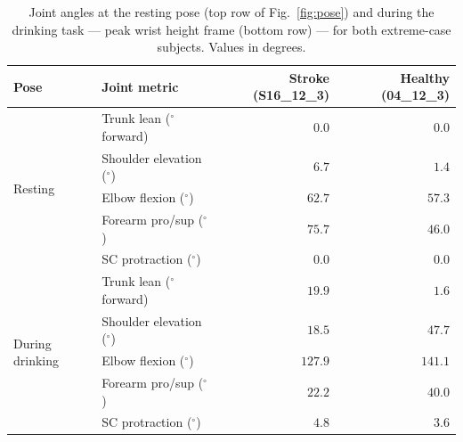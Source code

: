 \documentclass[journal,10pt,twocolumn]{IEEEtran}
\begin{document}
\begin{table}[h]
  \centering
  \caption{Joint angles at the resting pose (top row of Fig.~\ref{fig:pose})
           and during the drinking task --- peak wrist height frame (bottom row)
           --- for both extreme-case subjects. Values in degrees.}
  \label{tab:pose}
  \setlength{\tabcolsep}{6pt}
  \begin{tabular}{llrr}
    \toprule
    \textbf{Pose} & \textbf{Joint metric}
      & \textbf{Stroke (S16\_12\_3)}
      & \textbf{Healthy (04\_12\_3)} \\
    \midrule
    \multirow{5}{*}{Resting}
      & Trunk lean ($^{\circ}$ forward) & $0.0$ & $0.0$ \\
      & Shoulder elevation ($^{\circ}$) & $6.7$ & $1.4$ \\
      & Elbow flexion ($^{\circ}$)      & $62.7$ & $57.3$ \\
      & Forearm pro/sup ($^{\circ}$)    & $75.7$ & $46.0$ \\
      & SC protraction ($^{\circ}$)     & $0.0$  & $0.0$ \\
    \midrule
    \multirow{5}{*}{During drinking}
      & Trunk lean ($^{\circ}$ forward) & $19.9$ & $1.6$ \\
      & Shoulder elevation ($^{\circ}$) & $18.5$ & $47.7$ \\
      & Elbow flexion ($^{\circ}$)      & $127.9$ & $141.1$ \\
      & Forearm pro/sup ($^{\circ}$)    & $22.2$ & $40.0$ \\
      & SC protraction ($^{\circ}$)     & $4.8$  & $3.6$ \\
    \bottomrule
  \end{tabular}
\end{table}
\end{document}
